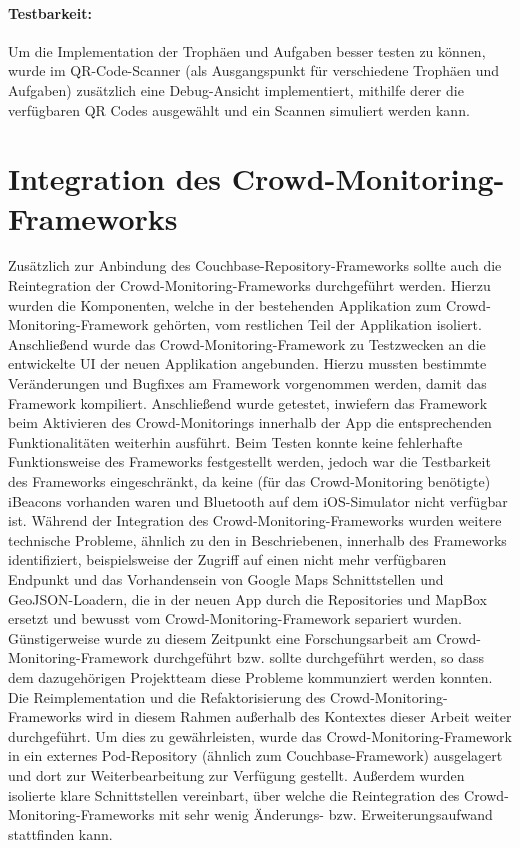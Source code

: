 \paragraph{Testbarkeit:} Um die Implementation der Trophäen und Aufgaben besser testen zu können, wurde im QR-Code-Scanner (als Ausgangspunkt für verschiedene Trophäen und Aufgaben) zusätzlich eine Debug-Ansicht implementiert, mithilfe derer die verfügbaren QR Codes ausgewählt und ein Scannen simuliert werden kann.

\section{Integration des Crowd-Monitoring-Frameworks}

Zusätzlich zur Anbindung des Couchbase-Repository-Frameworks sollte auch die Reintegration der Crowd-Monitoring-Frameworks durchgeführt werden. Hierzu wurden die Komponenten, welche in der bestehenden Applikation zum Crowd-Monitoring-Framework gehörten, vom restlichen Teil der Applikation isoliert. Anschließend wurde das Crowd-Monitoring-Framework zu Testzwecken an die entwickelte UI der neuen Applikation angebunden. Hierzu mussten bestimmte Veränderungen und Bugfixes am Framework vorgenommen werden, damit das Framework kompiliert. Anschließend wurde getestet, inwiefern das Framework beim Aktivieren des Crowd-Monitorings innerhalb der App die entsprechenden Funktionalitäten weiterhin ausführt. Beim Testen konnte keine fehlerhafte Funktionsweise des Frameworks festgestellt werden, jedoch war die Testbarkeit des Frameworks eingeschränkt, da keine (für das Crowd-Monitoring benötigte) iBeacons vorhanden waren und Bluetooth auf dem iOS-Simulator nicht verfügbar ist. Während der Integration des Crowd-Monitoring-Frameworks wurden weitere technische Probleme, ähnlich zu den in  Beschriebenen, innerhalb des Frameworks identifiziert, beispielsweise der Zugriff auf einen nicht mehr verfügbaren Endpunkt und das Vorhandensein von Google Maps Schnittstellen und GeoJSON-Loadern, die in der neuen App durch die Repositories und MapBox ersetzt und bewusst vom Crowd-Monitoring-Framework separiert wurden. Günstigerweise wurde zu diesem Zeitpunkt eine Forschungsarbeit am Crowd-Monitoring-Framework durchgeführt bzw. sollte durchgeführt werden, so dass dem dazugehörigen Projektteam diese Probleme kommunziert werden konnten. Die Reimplementation und die Refaktorisierung des Crowd-Monitoring-Frameworks wird in diesem Rahmen außerhalb des Kontextes dieser Arbeit weiter durchgeführt. Um dies zu gewährleisten, wurde das Crowd-Monitoring-Framework in ein externes Pod-Repository (ähnlich zum Couchbase-Framework) ausgelagert und dort zur Weiterbearbeitung zur Verfügung gestellt. Außerdem wurden isolierte klare Schnittstellen vereinbart, über welche die Reintegration des Crowd-Monitoring-Frameworks mit sehr wenig Änderungs- bzw. Erweiterungsaufwand stattfinden kann.

